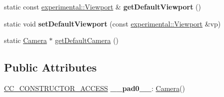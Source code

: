 \begin{DoxyCompactItemize}
\item 
\mbox{\label{classCamera_a707aad3e941fae07300ce6a4f2dd8c67}} 
static const \hyperlink{structexperimental_1_1Viewport}{experimental\+::\+Viewport} \& {\bfseries get\+Default\+Viewport} ()
\item 
\mbox{\label{classCamera_ad78279952e204bc98aad11dd344313b2}} 
static void {\bfseries set\+Default\+Viewport} (const \hyperlink{structexperimental_1_1Viewport}{experimental\+::\+Viewport} \&vp)
\item 
static \hyperlink{classCamera}{Camera} $\ast$ \hyperlink{classCamera_abadd52964c1a4c82d76a297631d09926}{get\+Default\+Camera} ()
\end{DoxyCompactItemize}
\subsection*{Public Attributes}
\begin{DoxyCompactItemize}
\item 
\mbox{\label{classCamera_adb50d0bf156afffe2545f5f1454ec053}} 
\hyperlink{_2cocos2d_2cocos_2base_2ccConfig_8h_a25ef1314f97c35a2ed3d029b0ead6da0}{C\+C\+\_\+\+C\+O\+N\+S\+T\+R\+U\+C\+T\+O\+R\+\_\+\+A\+C\+C\+E\+SS} {\bfseries \+\_\+\+\_\+pad0\+\_\+\+\_\+}\+: \hyperlink{classCamera}{Camera}()
\end{DoxyCompactItemize}
